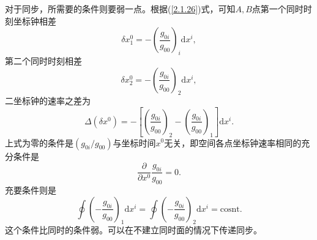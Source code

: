 \documentclass[11pt, a4paper, oneside, onecolumn]{ctexart}
\numberwithin{equation}{subsection}
\begin{document}
对于同步，所需要的条件则要弱一点。根据(\ref{2.1.26})式，可知$A,B$点第一个同时时刻坐标钟相差
\begin{equation}
\delta{}x_{1}^{0}=-\left(\frac{g_{0i}}{g_{00}}\right)_{i}\mathrm{d}x^{i},
\end{equation}
第二个同时时刻相差
\begin{equation}
\delta{}x_{2}^{0}=-\left(\frac{g_{0i}}{g_{00}}\right)_{2}\mathrm{d}x^{i},
\end{equation}
二坐标钟的速率之差为
\begin{equation}
\Delta{}\left(\delta{}x^{0}\right)=-\left[\left(\frac{g_{0i}}{g_{00}}\right)_{2}-\left(\frac{g_{0i}}{g_{00}}\right)_{1}\right]\mathrm{d}x^{i}.
\end{equation}
上式为零的条件是$\left(g_{0i}/g_{00}\right)$与坐标时间$x^{0}$无关，即空间各点坐标钟速率相同的充分条件是
\begin{equation}
\frac{\partial{}}{\partial{}x^{0}}\frac{g_{0i}}{g_{00}}=0.
\end{equation}
充要条件则是
\begin{equation}
\oint\left(-\frac{g_{0i}}{g_{00}}\right)_{1}\mathrm{d}x^{i}=\oint\left(-\frac{g_{0i}}{g_{00}}\right)_{2}\mathrm{d}x^{i}=\text{cosnt}.
\end{equation}
这个条件比同时的条件弱。可以在不建立同时面的情况下传递同步。
\end{document}
